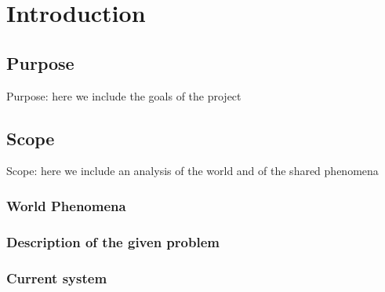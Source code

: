 \section{Introduction}
\label{sect:introduction}
\subsection{Purpose}
Purpose: here we include the goals of the project
\subsection{Scope}
Scope: here we include an analysis of the world and of the shared phenomena
\subsubsection{World Phenomena}
\subsubsection{Description of the given problem}
\subsubsection{Current system}
